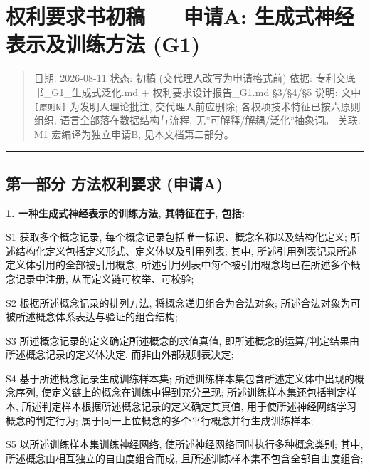 \documentclass[
]{article}
\author{}
\date{}
\begin{document}
\section{权利要求书初稿 --- 申请A: 生成式神经表示及训练方法
(G1)}\label{ux6743ux5229ux8981ux6c42ux4e66ux521dux7a3f-ux7533ux8bf7a-ux751fux6210ux5f0fux795eux7ecfux8868ux793aux53caux8badux7ec3ux65b9ux6cd5-g1}

\begin{quote}
日期: 2026-08-11 \textbar{} 状态: 初稿 (交代理人改写为申请格式前) 依据:
专利交底书\_G1\_生成式泛化.md + 权利要求设计报告\_G1.md §3/§4/§5 说明:
文中 \texttt{{[}原则N{]}} 为发明人理论批注, 交代理人前应删除;
各权项技术特征已按六原则组织, 语言全部落在数据结构与流程,
无''可解释/解耦/泛化''抽象词。 关联: M1 宏编译为独立申请B,
见本文档第二部分。
\end{quote}

\begin{center}\rule{0.5\linewidth}{0.5pt}\end{center}

\subsection{第一部分 方法权利要求
(申请A)}\label{ux7b2cux4e00ux90e8ux5206-ux65b9ux6cd5ux6743ux5229ux8981ux6c42-ux7533ux8bf7a}

\textbf{1. 一种生成式神经表示的训练方法, 其特征在于, 包括:}

S1 获取多个概念记录, 每个概念记录包括唯一标识、概念名称以及结构化定义;
所述结构化定义包括定义形式、定义体以及引用列表; 其中,
所述引用列表记录所述定义体引用的全部被引用概念,
所述引用列表中每个被引用概念均已在所述多个概念记录中注册,
从而定义链可枚举、可校验;

S2 根据所述概念记录的排列方法, 将概念递归组合为合法对象;
所述合法对象为可被所述概念体系表达与验证的组合结构;

S3 所述概念记录的定义确定所述概念的求值真值,
即所述概念的运算/判定结果由所述概念记录的定义体决定,
而非由外部规则表决定;

S4 基于所述概念记录生成训练样本集;
所述训练样本集包含所述定义体中出现的概念序列,
使定义链上的概念在训练中得到充分呈现; 所述训练样本集还包括判定样本,
所述判定样本根据所述概念记录的定义确定其真值,
用于使所述神经网络学习概念的判定行为;
属于同一上位概念的多个平行概念并行生成训练样本;

S5 以所述训练样本集训练神经网络, 使所述神经网络同时执行多种概念类别;
其中, 所述概念由相互独立的自由度组合而成,
且所述训练样本集不包含全部自由度组合;
\end{document}
